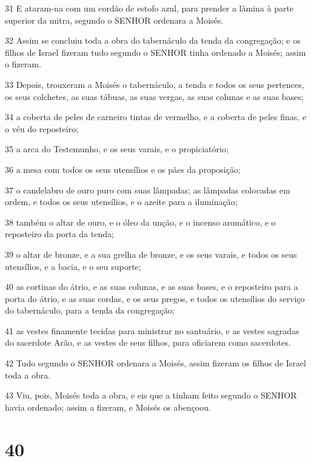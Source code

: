 \par 31 E ataram-na com um cordão de estofo azul, para prender a lâmina à parte superior da mitra, segundo o SENHOR ordenara a Moisés.
\par 32 Assim se concluiu toda a obra do tabernáculo da tenda da congregação; e os filhos de Israel fizeram tudo segundo o SENHOR tinha ordenado a Moisés; assim o fizeram.
\par 33 Depois, trouxeram a Moisés o tabernáculo, a tenda e todos os seus pertences, os seus colchetes, as suas tábuas, as suas vergas, as suas colunas e as suas bases;
\par 34 a coberta de peles de carneiro tintas de vermelho, e a coberta de peles finas, e o véu do reposteiro;
\par 35 a arca do Testemunho, e os seus varais, e o propiciatório;
\par 36 a mesa com todos os seus utensílios e os pães da proposição;
\par 37 o candelabro de ouro puro com suas lâmpadas; as lâmpadas colocadas em ordem, e todos os seus utensílios, e o azeite para a iluminação;
\par 38 também o altar de ouro, e o óleo da unção, e o incenso aromático, e o reposteiro da porta da tenda;
\par 39 o altar de bronze, e a sua grelha de bronze, e os seus varais, e todos os seus utensílios, e a bacia, e o seu suporte;
\par 40 as cortinas do átrio, e as suas colunas, e as suas bases, e o reposteiro para a porta do átrio, e as suas cordas, e os seus pregos, e todos os utensílios do serviço do tabernáculo, para a tenda da congregação;
\par 41 as vestes finamente tecidas para ministrar no santuário, e as vestes sagradas do sacerdote Arão, e as vestes de seus filhos, para oficiarem como sacerdotes.
\par 42 Tudo segundo o SENHOR ordenara a Moisés, assim fizeram os filhos de Israel toda a obra.
\par 43 Viu, pois, Moisés toda a obra, e eis que a tinham feito segundo o SENHOR havia ordenado; assim a fizeram, e Moisés os abençoou.

\chapter{40}

